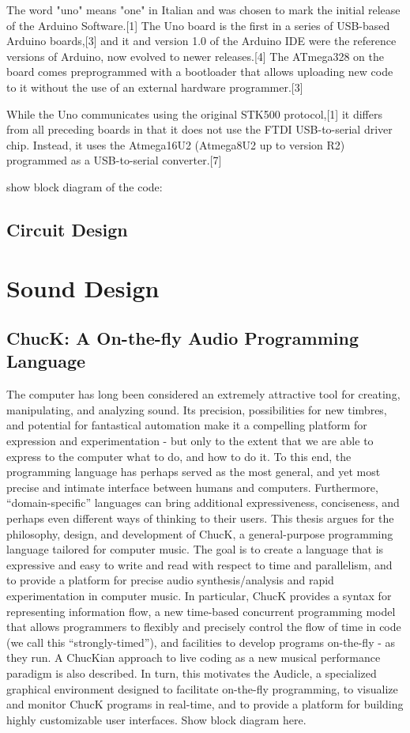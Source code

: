 The word "uno" means "one" in Italian and was chosen to mark the initial release of the 
Arduino Software.[1] The Uno board is the first in a series of USB-based Arduino boards,[3] 
and it and version 1.0 of the Arduino IDE were the reference versions of Arduino, now evolved 
to newer releases.[4] The ATmega328 on the board comes preprogrammed with a bootloader 
that allows uploading new code to it without the use of an external hardware programmer.[3]

While the Uno communicates using the original STK500 protocol,[1] it differs from all 
preceding boards in that it does not use the FTDI USB-to-serial driver chip. Instead, 
it uses the Atmega16U2 (Atmega8U2 up to version R2) programmed as a USB-to-serial converter.[7]

show block diagram of the code:

\subsection{Circuit Design}

\section{Sound Design}

\subsection{ChucK: A On-the-fly Audio Programming Language}
The computer has long been considered an extremely attractive tool for creating,
manipulating, and analyzing sound. Its precision, possibilities for new timbres, and
potential for fantastical automation make it a compelling platform for expression
and experimentation - but only to the extent that we are able to express to the
computer what to do, and how to do it. To this end, the programming language
has perhaps served as the most general, and yet most precise and intimate interface
between humans and computers. Furthermore, “domain-specific” languages can
bring additional expressiveness, conciseness, and perhaps even different ways of
thinking to their users.
This thesis argues for the philosophy, design, and development of ChucK, a
general-purpose programming language tailored for computer music. The goal is to
create a language that is expressive and easy to write and read with respect to time
and parallelism, and to provide a platform for precise audio synthesis/analysis and
rapid experimentation in computer music. In particular, ChucK provides a syntax
for representing information flow, a new time-based concurrent programming model
that allows programmers to flexibly and precisely control the flow of time in code (we
call this “strongly-timed”), and facilities to develop programs on-the-fly - as they
run. A ChucKian approach to live coding as a new musical performance paradigm is
also described. In turn, this motivates the Audicle, a specialized graphical environment 
designed to facilitate on-the-fly programming, to visualize and monitor ChucK
programs in real-time, and to provide a platform for building highly customizable
user interfaces.
Show block diagram here.
